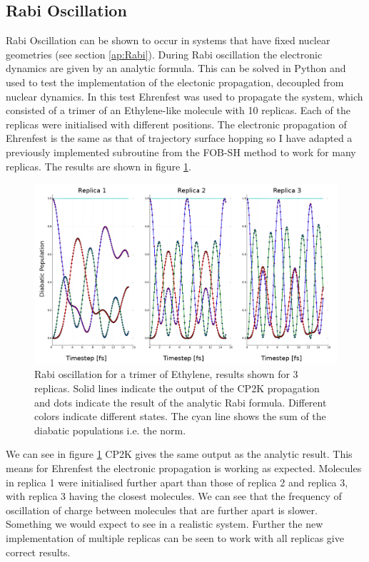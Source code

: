 \subsection{Rabi Oscillation}
Rabi Oscillation can be shown to occur in systems that have fixed nuclear geometries (see section \ref{ap:Rabi}). During Rabi oscillation the electronic dynamics are given by an analytic formula. This can be solved in Python and used to test the implementation of the electonic propagation, decoupled from nuclear dynamics. In this test Ehrenfest was used to propagate the system, which consisted of a trimer of an Ethylene-like molecule with 10 replicas. Each of the replicas were initialised with different positions. The electronic propagation of Ehrenfest is the same as that of trajectory surface hopping so I have adapted a previously implemented subroutine from the FOB-SH method \cite{spencer_fob-sh:_2016} to work for many replicas. The results are shown in figure \ref{fig:Rabi}.
\begin{figure}[H]
  \includegraphics[width=\textwidth]{./img/3_reps_RABI.png}
  \caption{\label{fig:Rabi}Rabi oscillation for a trimer of Ethylene, results shown for 3 replicas. Solid lines indicate the output of the CP2K propagation and dots indicate the result of the analytic Rabi formula. Different colors indicate different states. The cyan line shows the sum of the diabatic populations i.e. the norm.}
\end{figure}
\noindent We can see in figure \ref{fig:Rabi} CP2K gives the same output as the analytic result. This means for Ehrenfest the electronic propagation is working as expected. Molecules in replica 1 were initialised further apart than those of replica 2 and replica 3, with replica 3 having the closest molecules. We can see that the frequency of oscillation of charge between molecules that are further apart is slower. Something we would expect to see in a realistic system. Further the new implementation of multiple replicas can be seen to work with all replicas give correct results.
\\
